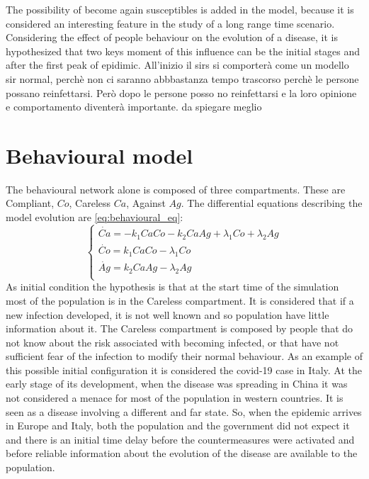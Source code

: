 The possibility of become again susceptibles is added in the model, because it is considered an interesting feature in the study of a long range time scenario. 
Considering the effect of people behaviour on the evolution of a disease, it is hypothesized that two keys moment of this influence can be the initial stages and after the first peak of epidimic. 
All'inizio il sirs si comporterà come un modello sir normal, perchè non ci saranno abbbastanza tempo trascorso perchè le persone possano reinfettarsi. Però dopo le persone posso no reinfettarsi e la loro opinione e comportamento diventerà importante. da spiegare meglio

\section{Behavioural model}
\label{sec:behavioral_model}
The behavioural network alone is composed of three compartments.
These are Compliant, $Co$, Careless $Ca$, Against $Ag$. 
The differential equations describing the model evolution are \ref{eq:behavioural_eq}: 
\begin{equation}
	\begin{cases}
		\dot{Ca} = -k_1 Ca Co - k_2 Ca Ag + \lambda_1 Co + \lambda_2 Ag \\
		\dot{Co} = k_1 Ca Co -  \lambda_1 Co \\
		\dot{Ag} = k_2 Ca Ag -  \lambda_2 Ag\\
	\end{cases}
	\label{eq:behavioural_eq}
\end{equation}
As initial condition the hypothesis is that at the start time of the simulation most of the population is in the Careless compartment. It is considered that if a new infection developed, it is not well known and so population have little information about it. The Careless compartment is composed by people that do not know about the risk associated with becoming infected, or that have not sufficient fear of the infection to modify their normal behaviour. 
As an example of this possible initial configuration it is considered the covid-19 case in Italy. At the early stage of its development, when the disease was spreading in China it was not considered a menace for most of the population in western countries. It is seen as a disease involving a different and far state. So, when the epidemic arrives in Europe and Italy, both the population and the government did not expect it and there is an initial time delay before the countermeasures were activated and before reliable information about the evolution of the disease are available to the population. 

